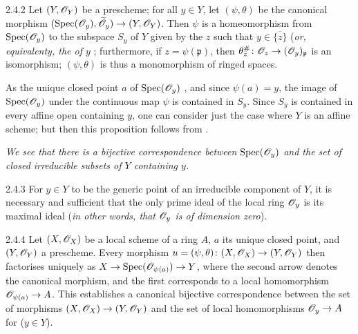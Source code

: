 \documentclass{book}
\begin{document}
\begin{envs}[Proposition]{2.4.2}
\label{prop-1.2.4.2}
Let $(Y,\mathscr{O}_Y)$ be a prescheme;
for all $y\in Y$, let $(\psi,\theta)$ be the canonical morphism
$({\mathop{\mathrm{Spec}}\nolimits}(\mathscr{O}_y),\widetilde{\mathscr{O}}_y)\to(Y,\mathscr{O}_Y)$. Then $\psi$ is a homeomorphism
from ${\mathop{\mathrm{Spec}}\nolimits}(\mathscr{O}_y)$ to the subspace $S_y$ of $Y$ given by the $z$ such that
$y\in\overline{\{z\}}$ (\emph{or, equivalenty, the \completelyunsure of $y$
}; furthermore, if $z=\psi(\mathfrak{p})$, then
$\theta_z^\#\colon\mathscr{O}_z\to(\mathscr{O}_y)_\mathfrak{p}$ is an isomorphism; $(\psi,\theta)$
is thus a monomorphism of ringed spaces.
\end{envs}
    
As the unique closed point $a$ of ${\mathop{\mathrm{Spec}}\nolimits}(\mathscr{O}_y)$ , and since $\psi(a)=y$, the image of ${\mathop{\mathrm{Spec}}\nolimits}(\mathscr{O}_y)$ under
the continuous map $\psi$ is contained in $S_y$. Since $S_y$ is contained in
every affine open containing $y$, one can consider just the case where $Y$ is an
affine scheme; but then this proposition follows from .
    
\emph{We see  that there is a bijective correspondence between
${\mathop{\mathrm{Spec}}\nolimits}(\mathscr{O}_y)$ and the set of closed irreducible subsets of $Y$ containing $y$.}
    
\begin{envs}[Corollary]{2.4.3}
\label{cor-1.2.4.3}
For $y\in Y$ to be the generic point of an
irreducible component of $Y$, it is necessary and sufficient that the only prime
ideal of the local ring $\mathscr{O}_y$ is its maximal ideal (\emph{in other words, that
$\mathscr{O}_y$ is of \emph{dimension zero}}).
\end{envs}
    
\begin{envs}[Proposition]{2.4.4}
\label{prop-1.2.4.4}
Let $(X,\mathscr{O}_X)$ be a local scheme of a ring
$A$, $a$ its unique closed point, and $(Y,\mathscr{O}_Y)$ a prescheme.  Every morphism
$u=(\psi,\theta)\colon(X,\mathscr{O}_X)\to(Y,\mathscr{O}_Y)$ then factorises uniquely as
$X\to{\mathop{\mathrm{Spec}}\nolimits}(\mathscr{O}_{\psi(a)})\to Y$, where the second arrow denotes the canonical
morphism, and the first corresponds to a local homomorphism $\mathscr{O}_{\psi(a)}\to A$.
This establishes a canonical bijective correspondence between the set of
morphisms $(X,\mathscr{O}_X)\to(Y,\mathscr{O}_Y)$ and the set of local homomorphisms $\mathscr{O}_y\to A$
for ($y\in Y$).
\end{envs}
    
\end{document}

